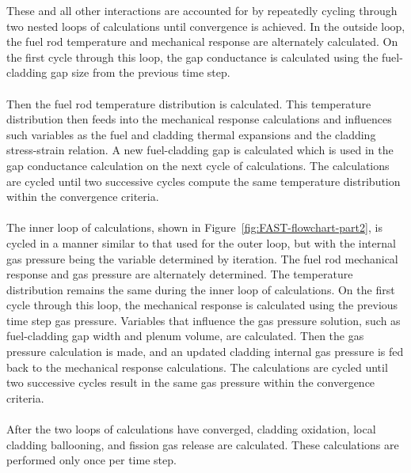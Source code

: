 These and all other interactions are accounted for by repeatedly cycling through two nested loops of
calculations until convergence is achieved. In the outside loop, the fuel rod temperature and
mechanical response are alternately calculated. On the first cycle through this loop, the gap
conductance is calculated using the fuel-cladding gap size from the previous time step.
\\
\\
Then the fuel rod temperature distribution is calculated. This temperature
distribution then feeds into the mechanical response calculations and
influences such variables as the fuel and cladding thermal expansions and
the cladding stress-strain relation. A new fuel-cladding gap is calculated
which is used in the gap conductance calculation on the next cycle of
calculations. The calculations are cycled until two successive cycles
compute the same temperature distribution within the convergence criteria.
\\
\\
The inner loop of calculations, shown in Figure~\ref{fig:FAST-flowchart-part2}, is cycled in a
manner similar to that used for the outer loop, but with the internal gas pressure being the
variable determined by iteration. The fuel rod mechanical response and gas pressure are alternately
determined. The temperature distribution remains the same during the inner loop of calculations. On
the first cycle through this loop, the mechanical response is calculated using the previous time
step gas pressure. Variables that influence the gas pressure solution, such as fuel-cladding gap
width and plenum volume, are calculated. Then the gas pressure calculation is made, and an updated
cladding internal gas pressure is fed back to the mechanical response calculations. The calculations
are cycled until two successive cycles result in the same gas pressure within the convergence
criteria.
\\
\\
After the two loops of calculations have converged, cladding oxidation, local cladding ballooning,
and fission gas release are calculated. These calculations are performed only once per time step.
